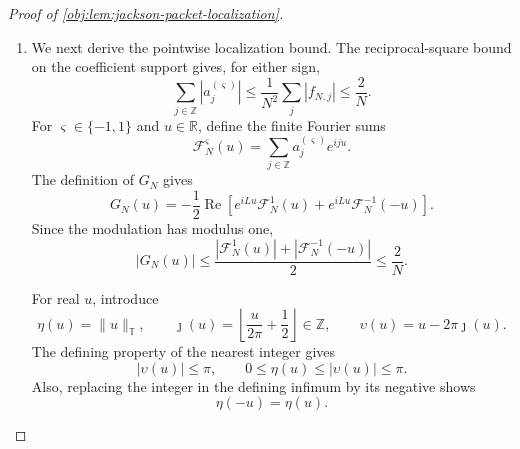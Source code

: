 \documentclass[11pt]{article}
\begin{document}
\begin{proof}[Proof of \cref{obj:lem:jackson-packet-localization}]
\begin{enumerate}
The forward-difference product identity is
\[
\begin{aligned}
(\delta^2a^{(\varsigma)})_j
={}&f_{N,j+2}(\delta^2\rho^{\varsigma})_j\\
&+\{(\delta f_N)_{j+1}+(\delta f_N)_j\}
                  (\delta\rho^{\varsigma})_j
+\rho_{j+1}^{\varsigma}(\delta^2f_N)_j.
\end{aligned}
\]
For \(|j|\leq2N\), the preceding estimates imply
\[
\begin{aligned}
|(\delta^2a^{(\varsigma)})_j|
\leq{}&
\frac{64}{N^4}|f_{N,j+2}|
+\frac{16}{N^3}|(\delta f_N)_{j+1}|\\
&+\frac{16}{N^3}|(\delta f_N)_j|
+\frac1{N^2}|(\delta^2f_N)_j|.
\end{aligned}
\]
For \(|j|>2N\), all three values \(f_{N,j}\), \(f_{N,j+1}\), and
\(f_{N,j+2}\) vanish, so this inequality also holds there. In particular,
\(\delta^2a^{(\varsigma)}\) has finite support. Summing and using invariance of full-line sums under integer shifts gives
\[
\begin{aligned}
\sum_j|(\delta^2a^{(\varsigma)})_j|
&\leq
\frac{64}{N^4}\sum_j|f_{N,j}|
+\frac{32}{N^3}\sum_j|(\delta f_N)_j|
+\frac1{N^2}\sum_j|(\delta^2f_N)_j|\\
&\leq\frac{262}{N^3}
\leq\frac{512}{N^3}.
\end{aligned}
\]

\item We next derive the pointwise localization bound. The reciprocal-square bound on the coefficient support gives, for either sign,
\[
\sum_{j\in\mathbb Z}|a_j^{(\varsigma)}|
\leq\frac1{N^2}\sum_j|f_{N,j}|
\leq\frac2N.
\]
For \(\varsigma\in\{-1,1\}\) and \(u\in\mathbb R\), define the finite Fourier sums
\[
\mathcal F_N^{\varsigma}(u)
=\sum_{j\in\mathbb Z}a_j^{(\varsigma)}e^{iju}.
\]
The definition of \(G_N\) gives
\[
G_N(u)
=-\frac12\operatorname{Re}
\left[
e^{iLu}\mathcal F_N^1(u)
+e^{iLu}\mathcal F_N^{-1}(-u)
\right].
\]
Since the modulation has modulus one,
\[
|G_N(u)|
\leq
\frac{|\mathcal F_N^1(u)|+|\mathcal F_N^{-1}(-u)|}{2}
\leq\frac2N.
\]

For real \(u\), introduce
\[
\eta(u)=\|u\|_{\mathbb T},\qquad
\jmath(u)=\left\lfloor\frac{u}{2\pi}+\frac12\right\rfloor\in\mathbb Z,
\qquad
\upsilon(u)=u-2\pi\jmath(u).
\]
The defining property of the nearest integer gives
\[
|\upsilon(u)|\leq\pi,
\qquad
0\leq\eta(u)\leq|\upsilon(u)|\leq\pi.
\]
Also, replacing the integer in the defining infimum by its negative shows
\[
\eta(-u)=\eta(u).
\]


\end{enumerate}
\end{proof}
\end{document}

